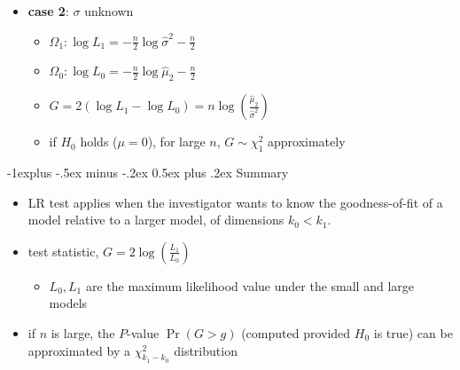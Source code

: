 \documentclass[10pt, landscape]{article}
\makeatletter
\renewcommand{\subsection}{\@startsection{subsection}{2}{0mm}%
  {-1explus -.5ex minus -.2ex}%
  {0.5ex plus .2ex}%
{\normalfont\normalsize\bfseries}}
\makeatother
\begin{document}
\begin{multicols*}{4}
\begin{itemize}
    \item \textbf{case 2}: $\sigma$ unknown
      \begin{itemize}
        \item $\Omega_1 : \log L_1 = -\frac{n}{2} \log \hat\sigma^2 - \frac{n}{2}$
        \item $\Omega_0 : \log L_0 = -\frac{n}{2} \log \hat\mu_2 - \frac{n}{2}$
        \item $G = 2(\log L_1 - \log L_0) = n\log ( \frac{\hat\mu_2}{\hat\sigma^2} )$
        \item if $H_0$ holds ($\mu = 0$), for large $n$, $G \sim \chi^2_1$ approximately
      \end{itemize}
  \end{itemize}

  \subsection{Summary}

  \begin{itemize}
    \item LR test applies when the investigator wants to know the goodness-of-fit of a model relative to a larger model, of dimensions $k_0 < k_1$.
    \item test statistic, $G = 2\log \left( \frac{L_1}{L_0} \right)$
      \begin{itemize}
        \item $L_0, L_1$ are the maximum likelihood value under the small and large models
      \end{itemize}
    \item if $n$ is large, the $P$-value $\Pr (G > g)$ (computed provided $H_0$ is true) can be approximated by a $\chi^2_{k_1-k_0}$ distribution
  \end{itemize}




\end{multicols*}
\end{document}
